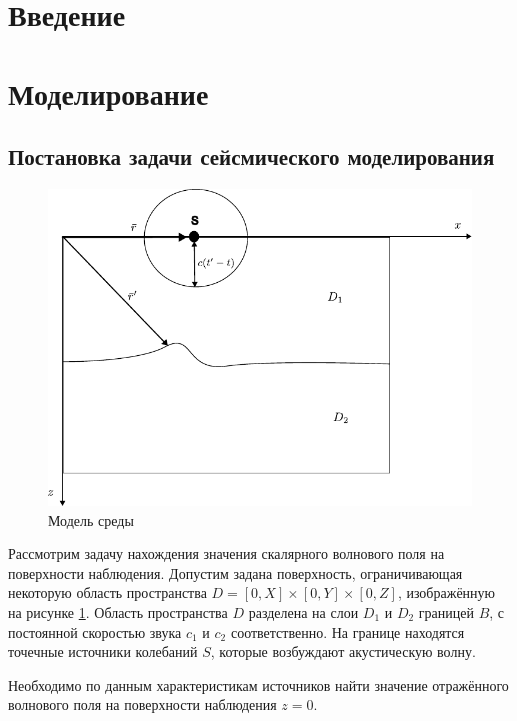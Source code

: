 \documentclass[a4paper, fontsize=14pt]{article}
\begin{document}
 
	\tableofcontents
	\newpage
	\section*{Введение} 
	
	\newpage
	\section{Моделирование} 
	\subsection{Постановка задачи сейсмического моделирования} 
	\begin{figure}[h]
		
		\centering
		\includegraphics{migration_fig.pdf}
		
		\caption{Модель среды}
		\label{fig:mig}
	\end{figure}
	Рассмотрим задачу нахождения значения скалярного волнового поля на поверхности
	наблюдения.
	Допустим задана поверхность, ограничивающая некоторую область пространства
	$D=[0,X]\times [0,Y]\times [0,Z]$, изображённую на рисунке \ref{fig:mig}.
	Область пространства $D$ разделена на слои $D_1$ и $D_2$ границей $B$, с постоянной
	скоростью звука $c_1$ и $c_2$ соответственно.
	На границе находятся точечные источники колебаний $S$, которые возбуждают
	акустическую волну.
	
	Необходимо по данным характеристикам источников найти значение отражённого волнового поля
	на поверхности наблюдения $z=0$.
	
\end{document}
